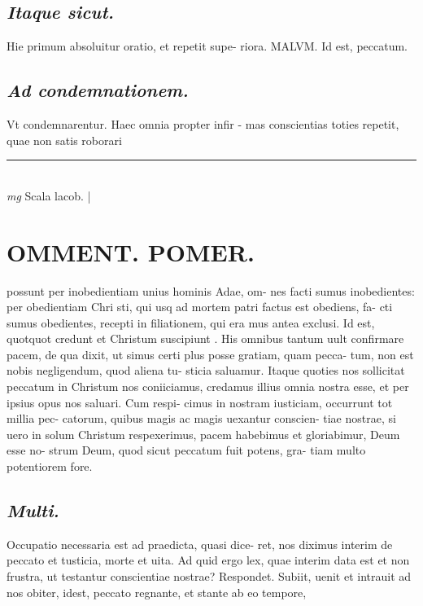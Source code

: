 \documentclass{article}
\begin{document}
\begin{pages}
\subsection*{\textit{Itaque sicut. }}\pstart Hie primum absoluitur oratio, et repetit supe- riora. MALVM. Id est, peccatum.   \pend
{}
{}
\subsection*{\textit{Ad condemnationem. }}\pstart Vt condemnarentur. Haec omnia propter infir - mas conscientias toties repetit, quae non satis roborari  \pend
\vspace{0.5cm}\noindent
\vspace{0.2cm}\rule{1cm}{0.2pt}\\ 
\hspace{0.2cm}\textit{mg}
\footnotesize Scala lacob.  
\normalsize| 
\section*{OMMENT. POMER.  }\pstart possunt per inobedientiam unius hominis Adae, om- nes facti sumus inobedientes: per obedientiam Chri sti, qui usq ad mortem patri factus est obediens, fa- cti sumus obedientes, recepti in filiationem, qui era mus antea exclusi.  \pend\pstart Id est, quotquot credunt et Christum suscipiunt .  His omnibus tantum uult confirmare pacem, de qua dixit, ut simus certi plus posse gratiam, quam pecca- tum, non est nobis negligendum, quod aliena tu- sticia saluamur. Itaque quoties nos sollicitat peccatum in Christum nos coniiciamus, credamus illius omnia nostra esse, et per ipsius opus nos saluari. Cum respi- cimus in nostram iusticiam, occurrunt tot millia pec- catorum, quibus magis ac magis uexantur conscien- tiae nostrae, si uero in solum Christum respexerimus, pacem habebimus et gloriabimur, Deum esse no- strum Deum, quod sicut peccatum fuit potens, gra- tiam multo potentiorem fore.   \pend
{}
{}
\subsection*{\textit{Multi. }}\pstart Occupatio necessaria est ad praedicta, quasi dice- ret, nos diximus interim de peccato et tusticia, morte et uita. Ad quid ergo lex, quae interim data est et non frustra, ut testantur conscientiae nostrae? Respondet. Subiit, uenit et intrauit ad nos obiter, idest, peccato regnante, et stante ab eo tempore,  \pend
{}
{}

\end{pages}
\end{document}
